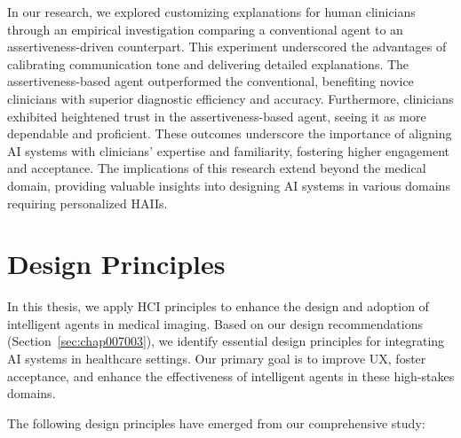 \textcolor{revised}{In our research, we explored customizing explanations for human clinicians through an empirical investigation comparing a conventional agent to an assertiveness-driven counterpart.
This experiment underscored the advantages of calibrating communication tone and delivering detailed explanations.
The assertiveness-based agent outperformed the conventional, benefiting novice clinicians with superior diagnostic efficiency and accuracy.
Furthermore, clinicians exhibited heightened trust in the assertiveness-based agent, seeing it as more dependable and proficient.
These outcomes underscore the importance of aligning \ac{AI} systems with clinicians' expertise and familiarity, fostering higher engagement and acceptance.
The implications of this research extend beyond the medical domain, providing valuable insights into designing \ac{AI} systems in various domains requiring personalized \acp{HAII}.}

\section{Design Principles}
\label{sec:chap008002}

\textcolor{revised}{In this thesis, we apply \ac{HCI} principles to enhance the design and adoption of intelligent agents in medical imaging.
Based on our design recommendations (Section~\ref{sec:chap007003}), we identify essential design principles for integrating \ac{AI} systems in healthcare settings.
Our primary goal is to improve \ac{UX}, foster acceptance, and enhance the effectiveness of intelligent agents in these high-stakes domains.}

\vspace{1.00mm}

\noindent
\textcolor{revised}{The following design principles have emerged from our comprehensive study:}

\vspace{0.05mm}

